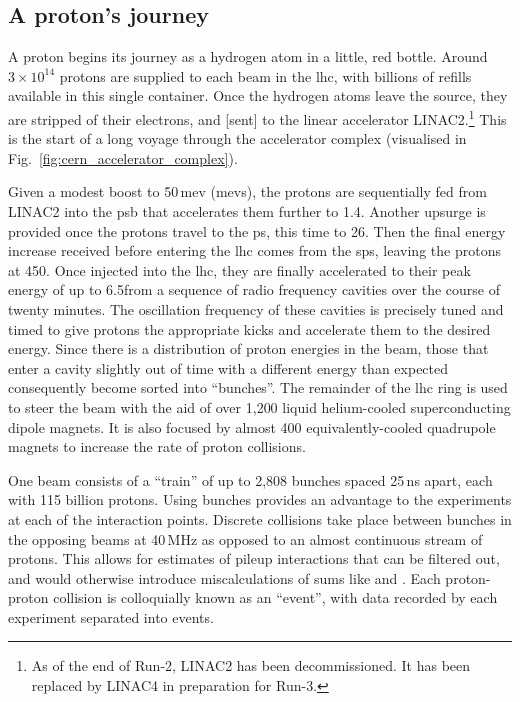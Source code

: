 \subsection{A proton's journey}  %
\label{subsec:protons_journey}

A proton begins its journey as a hydrogen atom in a little, red bottle. Around $\text{3} \times \text{10}^{\text{14}}$ protons are supplied to each beam in the \acrshort{lhc}, with billions of refills available in this single container. Once the hydrogen atoms leave the source, they are stripped of their electrons, and [sent] to the linear accelerator LINAC2.\footnote{As of the end of Run-2, LINAC2 has been decommissioned. It has been replaced by LINAC4 in preparation for Run-3.} This is the start of a long voyage through the accelerator complex (visualised in Fig.~\ref{fig:cern_accelerator_complex}).

Given a modest boost to 50\,\acrshort{mev} (\acrlong{mev}s), the protons are sequentially fed from LINAC2 into the \acrfull{psb} that accelerates them further to 1.4\GeV. Another upsurge is provided once the protons travel to the \acrfull{ps}, this time to 26\GeV. Then the final energy increase received before entering the \acrshort{lhc} comes from the \acrfull{sps}, leaving the protons at 450\GeV. Once injected into the \acrshort{lhc}, they are finally accelerated to their peak energy of up to 6.5\TeV from a sequence of radio frequency cavities over the course of twenty minutes. The oscillation frequency of these cavities is precisely tuned and timed to give protons the appropriate kicks and accelerate them to the desired energy. Since there is a distribution of proton energies in the beam, those that enter a cavity slightly out of time with a different energy than expected consequently become sorted into ``bunches''. The remainder of the \acrshort{lhc} ring is used to steer the beam with the aid of over 1,200 liquid helium-cooled superconducting dipole magnets. It is also focused by almost 400 equivalently-cooled quadrupole magnets to increase the rate of proton collisions.

One beam consists of a ``train'' of up to 2,808 bunches spaced 25\,ns apart, each with 115 billion protons. Using bunches provides an advantage to the experiments at each of the interaction points. Discrete collisions take place between bunches in the opposing beams at 40\,MHz as opposed to an almost continuous stream of protons. This allows for estimates of \gls{pileup} interactions that can be filtered out, and would otherwise introduce miscalculations of sums like \ptmiss and \HT. Each proton-proton collision is colloquially known as an ``event'', with data recorded by each experiment separated into events.

